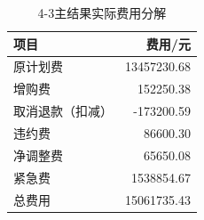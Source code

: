 \begin{table}[htbp]\centering\small
\caption{4-3主结果实际费用分解}
\begin{tabular}{lr}\toprule
项目 & 费用/元\\\midrule
原计划费 & 13457230.68\\
增购费 & 152250.38\\
取消退款（扣减） & -173200.59\\
违约费 & 86600.30\\
净调整费 & 65650.08\\
紧急费 & 1538854.67\\
总费用 & 15061735.43\\
\bottomrule\end{tabular}\end{table}

